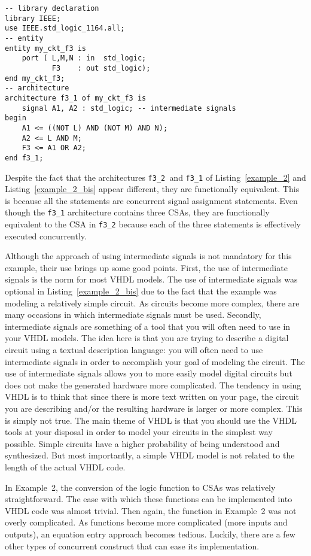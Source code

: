 \begin{lstlisting}[float, label=example_2_bis, caption=Alternative solution of Example~2.]
-- library declaration
library IEEE;
use IEEE.std_logic_1164.all;
-- entity
entity my_ckt_f3 is
	port ( L,M,N : in  std_logic;
	       F3    : out std_logic);
end my_ckt_f3;
-- architecture
architecture f3_1 of my_ckt_f3 is
	signal A1, A2 : std_logic; -- intermediate signals
begin
	A1 <= ((NOT L) AND (NOT M) AND N);
	A2 <= L AND M;
	F3 <= A1 OR A2;
end f3_1;
\end{lstlisting}

Despite the fact that the architectures \texttt{f3\_2 }and \texttt{f3\_1} of Listing~\ref{example_2} and Listing~\ref{example_2_bis} appear different, they are functionally equivalent. This is because all the statements are concurrent signal assignment statements. Even though the \texttt{f3\_1} architecture contains three CSAs, they are functionally equivalent to the CSA in \texttt{f3\_2} because each of the three statements is effectively executed concurrently.

Although the approach of using intermediate signals is not mandatory for this example, their use brings up some good points. First, the use of intermediate signals is the norm for most VHDL models. The use of intermediate signals was optional in Listing~\ref{example_2_bis} due to the fact that the example was modeling a relatively simple circuit. As circuits become more complex, there are many occasions in which intermediate signals must be used. Secondly, intermediate signals are something of a tool that you will often need to use in your VHDL models. The idea here is that you are trying to describe a digital circuit using a textual description language: you will often need to use intermediate signals in order to accomplish your goal of modeling the circuit. The use of intermediate signals allows you to more easily model digital circuits but does not make the generated hardware more complicated. The tendency in using VHDL is to think that since there is more text written on your page, the circuit you are describing and/or the resulting hardware is larger or more complex. This is simply not true. The main theme of VHDL is that you should use the VHDL tools at your disposal in order to model your circuits in the simplest way possible. Simple circuits have a higher probability of being understood and synthesized. But most importantly, a simple VHDL model is not related to the length of the actual VHDL code.

In Example~2, the conversion of the logic function to CSAs was relatively straightforward. The ease with which these functions can be implemented into VHDL code was almost trivial. Then again, the function in Example~2 was not overly complicated. As functions become more complicated (more inputs and outputs), an equation entry approach becomes tedious. Luckily, there are a few other types of concurrent construct that can ease its implementation.

